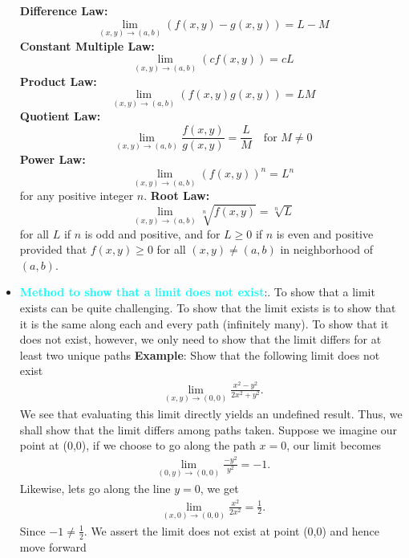 \documentclass{report}
\begin{document}
\begin{itemize}
            \textbf{Difference Law:}
            \[
                \lim_{(x,y) \to (a,b)} (f(x,y) - g(x,y)) = L - M \tag{4.6}
            \]
            \textbf{Constant Multiple Law:}
            \[
                \lim_{(x,y) \to (a,b)} (cf(x,y)) = cL \tag{4.7}
            \]
            \textbf{Product Law:}
            \[
                \lim_{(x,y) \to (a,b)} (f(x,y)g(x,y)) = LM \tag{4.8}
            \]
            \textbf{Quotient Law:}
            \[
                \lim_{(x,y) \to (a,b)} \frac{f(x,y)}{g(x,y)} = \frac{L}{M} \quad \text{for } M \neq 0 \tag{4.9}
            \]
            \textbf{Power Law:}
            \[
                \lim_{(x,y) \to (a,b)} (f(x,y))^n = L^n \tag{4.10}
            \]
            for any positive integer $n$.
            \textbf{Root Law:}
            \[
                \lim_{(x,y) \to (a,b)} \sqrt[n]{f(x,y)} = \sqrt[n]{L} \tag{4.11}
            \]
            for all $L$ if $n$ is odd and positive, and for $L \geq 0$ if $n$ is even and positive provided that $f(x, y) \geq 0$ for all $(x, y) \neq (a, b)$ in neighborhood of $(a, b)$.
        \item \textbf{\textcolor{cyan}{Method to show that a limit does not exist}}:. To show that a limit exists can be quite challenging. To show that the limit exists is to show that it is the same along each and every path (infinitely many). To show that it does not exist, however, we only need to show that the limit differs for at least two unique paths
            \bigbreak \noindent 
            \textbf{Example}: Show that the following limit does not exist
            \begin{align*}
                \lim\limits_{(x,y) \to (0,0)}{\frac{x^{2}-y^{2}}{2x^{2} + y^{2}}}
            .\end{align*}
                We see that evaluating this limit directly yields an undefined result. Thus, we shall show that the limit differs among paths taken. Suppose we imagine our point at (0,0), if we choose to go along the path $x=0$, our limit becomes
                \begin{align*}
                    \lim\limits_{(0,y) \to (0,0)}{\frac{-y^{2}}{y^{2}}} = -1
                .\end{align*}
                Likewise, lets go along the line $y=0$, we get
                \begin{align*}
                    \lim\limits_{(x,0) \to (0,0)}{\frac{x^{2}}{2x^{2}}} = \frac{1}{2}
                .\end{align*}
                Since $-1 \neq \frac{1}{2}$. We assert the limit does not exist at point (0,0) and hence move forward

\end{itemize}
\end{document}
